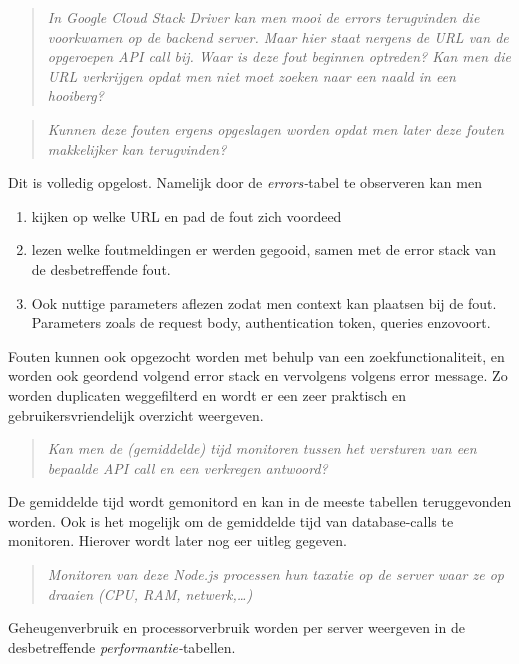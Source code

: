 \begin{quote}
	\textit{In Google Cloud Stack Driver kan men mooi de errors terugvinden die voorkwamen op de backend server. Maar hier staat nergens de URL van de opgeroepen API call bij. Waar is deze fout beginnen optreden? Kan men die URL verkrijgen opdat men niet moet zoeken naar een naald in een hooiberg?}
\end{quote}

\begin{quote}
	\textit{Kunnen deze fouten ergens opgeslagen worden opdat men later deze fouten makkelijker kan terugvinden?}
\end{quote}


Dit is volledig opgelost. Namelijk door de \textit{errors-}tabel te observeren kan men 
\begin{enumerate}
	\item kijken op welke URL en pad de fout zich voordeed
	\item lezen welke foutmeldingen er werden gegooid, samen met de error stack van de desbetreffende fout.
	\item Ook nuttige parameters aflezen zodat men context kan plaatsen bij de fout. Parameters zoals de request body, authentication token, queries enzovoort.
\end{enumerate}

Fouten kunnen ook opgezocht worden met behulp van een zoekfunctionaliteit, en worden ook geordend volgend error stack en vervolgens volgens error message. Zo worden duplicaten weggefilterd en wordt er een zeer praktisch en gebruikersvriendelijk overzicht weergeven.

\begin{quote}
	\textit{Kan men de (gemiddelde) tijd monitoren tussen het versturen van een bepaalde API call en een verkregen antwoord?}
\end{quote}

De gemiddelde tijd wordt gemonitord en kan in de meeste tabellen teruggevonden worden. Ook is het mogelijk om de gemiddelde tijd van database-calls te monitoren. Hierover wordt later nog eer uitleg gegeven.

\begin{quote}
	\textit{Monitoren van deze Node.js processen hun taxatie op de server waar ze op draaien (CPU, RAM, netwerk,…)}
\end{quote}

Geheugenverbruik en processorverbruik worden per server weergeven in de desbetreffende \textit{performantie-}tabellen.


